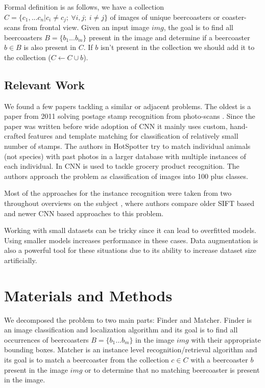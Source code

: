 \documentclass{article}
\begin{document}
Formal definition is as follows, we have a collection $C=\{c_1,...c_n | c_i \neq c_j;\ \forall i,j;\ i \neq j\}$ of images of unique beercoasters or coaster-scans from frontal view.
Given an input image $img$, the goal is to find all beercoasters $B=\{b_1...b_m\}$ present in the image 
and determine if a beercoaster $b \in B$ is also present in $C$. 
If $b$ isn't present in the collection we should add it to the collection ($C \leftarrow C \cup b$).

\subsection{Relevant Work}
We found a few papers tackling a similar or adjacent problems.
The oldest is a paper from 2011 solving postage stamp recognition from photo-scans \cite{}.
Since the paper was written before wide adoption of CNN it mainly uses custom, hand-crafted features and template matching for classification of relatively small number of stamps.
The authors in HotSpotter \cite{} try to match individual animals (not species) with past photos in a larger database with multiple instances of each individual.
In \cite{} CNN is used to tackle grocery product recognition. The authors approach the problem as classification of images into 100 plus classes.

Most of the approaches for the instance recognition were taken from two throughout overviews on the subject \cite{} \cite{},
where authors compare older SIFT based and newer CNN based approaches to this problem.

Working with small datasets can be tricky since it can lead to overfitted models. Using smaller models increases performance in these cases.\cite{} Data augmentation is also a powerful tool for these situations due to its ability to 
increase dataset size artificially. \cite{}



\section{Materials and Methods}
We decomposed the problem to two main parts: Finder and Matcher.
Finder is an image classification and localization algorithm and its goal is to find all
occurrences of beercoasters $B=\{b_1...b_m\}$ in the image $img$ with their appropriate bounding boxes.
Matcher is an instance level recognition/retrieval algorithm and its goal is to match 
a beercoaster from the collection $c \in C$ with a beercoaster $b$ present in the image $img$
or to determine that no matching beercoaster is present in the image.
\end{document}
